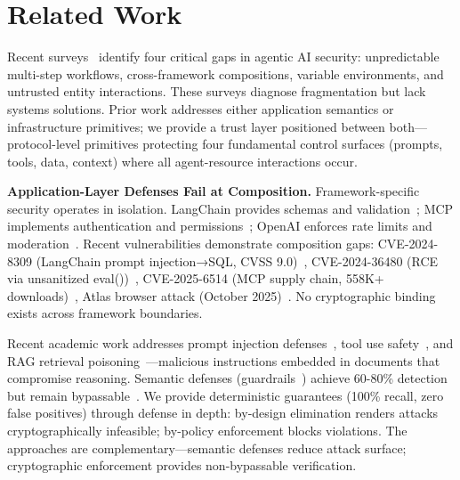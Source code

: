 \section{Related Work}
\label{sec:related-work}

Recent surveys~\cite{acm-ai-agents-survey2024,agentic-security-survey2025,gong-prompt-injection2024,liu-protocol-exploits2025} identify four critical gaps in agentic AI security: unpredictable multi-step workflows, cross-framework compositions, variable environments, and untrusted entity interactions. These surveys diagnose fragmentation but lack systems solutions. Prior work addresses either application semantics or infrastructure primitives; we provide a trust layer positioned between both—protocol-level primitives protecting four fundamental control surfaces (prompts, tools, data, context) where all agent-resource interactions occur.

\textbf{Application-Layer Defenses Fail at Composition.} Framework-specific security operates in isolation. LangChain provides schemas and validation~\cite{langchain2023}; MCP implements authentication and permissions~\cite{mcp2024}; OpenAI enforces rate limits and moderation~\cite{openai-assistants2024}. Recent vulnerabilities demonstrate composition gaps: CVE-2024-8309 (LangChain prompt injection→SQL, CVSS 9.0)~\cite{cve-2024-8309}, CVE-2024-36480 (RCE via unsanitized eval())~\cite{cve-2024-36480}, CVE-2025-6514 (MCP supply chain, 558K+ downloads)~\cite{github-mcp-cve}, Atlas browser attack (October 2025)~\cite{atlas-cve,openai-ciso-atlas}. No cryptographic binding exists across framework boundaries.

Recent academic work addresses prompt injection defenses~\cite{perez2022ignore,liu2023prompt,jain2023baseline}, tool use safety~\cite{ruan2023identifying}, and RAG retrieval poisoning~\cite{zou2024poisonedrag,cheng2024parden}—malicious instructions embedded in documents that compromise reasoning. Semantic defenses (guardrails~\cite{nemoguardrails2023,rebuff2023,llamaguard2023}) achieve 60-80\% detection but remain bypassable~\cite{wei2023jailbroken,zou2023universal}. We provide deterministic guarantees (100\% recall, zero false positives) through defense in depth: by-design elimination renders attacks cryptographically infeasible; by-policy enforcement blocks violations. The approaches are complementary—semantic defenses reduce attack surface; cryptographic enforcement provides non-bypassable verification.

